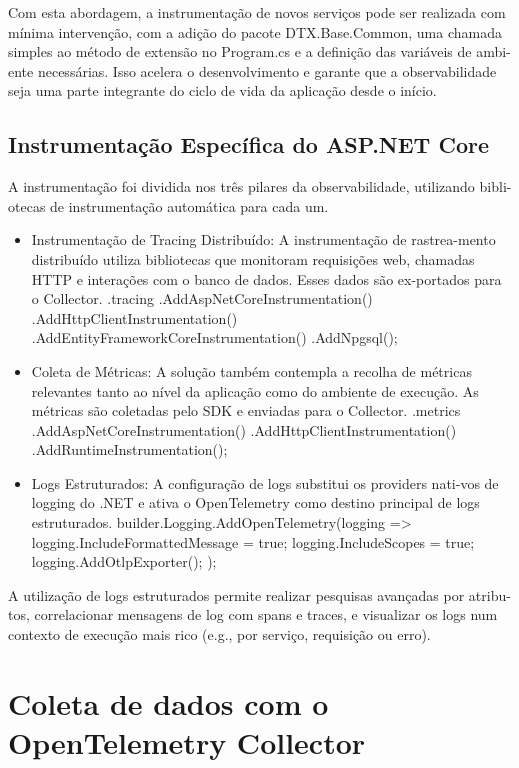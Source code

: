 Com esta abordagem, a instrumentação de novos serviços pode ser realizada com mínima intervenção, com a adição do pacote DTX.Base.Common, uma chamada simples ao método de extensão no Program.cs e a definição das variáveis de ambi-ente necessárias. Isso acelera o desenvolvimento e garante que a observabilidade seja uma parte integrante do ciclo de vida da aplicação desde o início.

\subsection{Instrumentação Específica do ASP.NET Core}

A instrumentação foi dividida nos três pilares da observabilidade, utilizando bibli-otecas de instrumentação automática para cada um.

\begin{itemize}
    \item Instrumentação de Tracing Distribuído: A instrumentação de rastrea-mento distribuído utiliza bibliotecas que monitoram requisições web, chamadas HTTP e interações com o banco de dados. Esses dados são ex-portados para o Collector.
.tracing
    .AddAspNetCoreInstrumentation()
    .AddHttpClientInstrumentation()
    .AddEntityFrameworkCoreInstrumentation()
    .AddNpgsql();
    \item Coleta de Métricas: A solução também contempla a recolha de métricas relevantes tanto ao nível da aplicação como do ambiente de execução. As métricas são coletadas pelo SDK e enviadas para o Collector.
.metrics
    .AddAspNetCoreInstrumentation()
    .AddHttpClientInstrumentation()
    .AddRuntimeInstrumentation();
    \item Logs Estruturados: A configuração de logs substitui os providers nati-vos de logging do .NET e ativa o OpenTelemetry como destino principal de logs estruturados.
builder.Logging.AddOpenTelemetry(logging =>
{
    logging.IncludeFormattedMessage = true;
    logging.IncludeScopes = true;
    logging.AddOtlpExporter();
});
\end{itemize}

A utilização de logs estruturados permite realizar pesquisas avançadas por atribu-tos, correlacionar mensagens de log com spans e traces, e visualizar os logs num contexto de execução mais rico (e.g., por serviço, requisição ou erro).

\section{Coleta de dados com o OpenTelemetry Collector}

